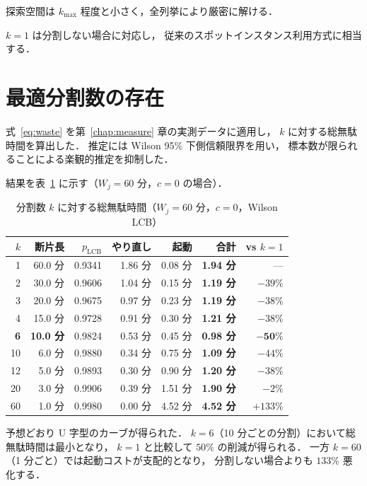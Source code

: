 \documentclass[11pt,a4paper]{ltjsreport}
\begin{document}
探索空間は $k_{\max}$ 程度と小さく，全列挙により厳密に解ける．

$k = 1$ は分割しない場合に対応し，
従来のスポットインスタンス利用方式に相当する．

\section{最適分割数の存在}
\label{sec:kstar}

式~\eqref{eq:waste} を第~\ref{chap:measure} 章の実測データに適用し，
$k$ に対する総無駄時間を算出した．
推定には Wilson 95\% 下側信頼限界を用い，
標本数が限られることによる楽観的推定を抑制した．

結果を表~\ref{tab:ucurve} に示す（$W_j = 60$ 分，$c = 0$ の場合）．

\begin{table}[htbp]
\centering
\caption{分割数 $k$ に対する総無駄時間（$W_j = 60$ 分，$c = 0$，Wilson LCB）}
\label{tab:ucurve}
\small
\begin{tabular}{@{}rrrrrrr@{}}
\toprule
$k$ & 断片長 & $p_{\mathrm{LCB}}$ & やり直し & 起動 & \textbf{合計} & vs $k{=}1$ \\
\midrule
1  & 60.0 分 & 0.9341 & 1.86 分 & 0.08 分 & \textbf{1.94 分} & --- \\
2  & 30.0 分 & 0.9606 & 1.04 分 & 0.15 分 & \textbf{1.19 分} & $-39\%$ \\
3  & 20.0 分 & 0.9675 & 0.97 分 & 0.23 分 & \textbf{1.19 分} & $-38\%$ \\
4  & 15.0 分 & 0.9728 & 0.91 分 & 0.30 分 & \textbf{1.21 分} & $-38\%$ \\
\textbf{6}  & \textbf{10.0 分} & 0.9824 & 0.53 分 & 0.45 分 & \textbf{0.98 分} & $\mathbf{-50\%}$ \\
10 & 6.0 分  & 0.9880 & 0.34 分 & 0.75 分 & \textbf{1.09 分} & $-44\%$ \\
12 & 5.0 分  & 0.9893 & 0.30 分 & 0.90 分 & \textbf{1.20 分} & $-38\%$ \\
20 & 3.0 分  & 0.9906 & 0.39 分 & 1.51 分 & \textbf{1.90 分} & $-2\%$ \\
60 & 1.0 分  & 0.9980 & 0.00 分 & 4.52 分 & \textbf{4.52 分} & $+133\%$ \\
\bottomrule
\end{tabular}
\end{table}

予想どおり U 字型のカーブが得られた．
$k = 6$（10 分ごとの分割）において総無駄時間は最小となり，
$k=1$ と比較して $50\%$ の削減が得られる．
一方 $k = 60$（1 分ごと）では起動コストが支配的となり，
分割しない場合よりも $133\%$ 悪化する．
\end{document}
